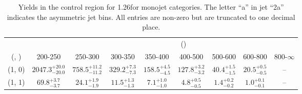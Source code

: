\begin{table}[h!]
\tiny
\centering
\caption{Yields in the \mj control region for 1.26\ifb for monojet categories. The letter ``a'' in jet \eg ``2a''  indicates the asymmetric jet bins. All entries are non-zero but are truncated to one decimal place.\label{tab:yieldssep_mu_wjetstolnuht_mono}}
\begin{tabular}
{ccccccccc}
	\hline\hline
&	& \multicolumn{8}{c}{\scalht (\gev)} \\ 
	 (\njet,  \nb) & 200-250 & 250-300 & 300-350 & 350-400 & 400-500 & 500-600 & 600-800 & 800-$\infty$ \\ [0.8ex] 
\hline
	(1, 0) & $2047.3^{+ 20.0 }_{- 20.0 }$ & $758.5^{+ 11.2 }_{- 11.2 }$ & $329.2^{+ 7.3 }_{- 7.3 }$ & $158.5^{+ 4.5 }_{- 4.5 }$ & $127.8^{+ 3.2 }_{- 3.2 }$ & $40.4^{+ 1.5 }_{- 1.5 }$ & $20.5^{+ 0.5 }_{- 0.5 }$ & -- \\[0.5ex] 
	(1, 1) & $69.8^{+ 3.7 }_{- 3.7 }$ & $24.1^{+ 1.9 }_{- 1.9 }$ & $11.5^{+ 1.3 }_{- 1.3 }$ & $7.1^{+ 1.0 }_{- 1.0 }$ & $4.8^{+ 0.5 }_{- 0.5 }$ & $1.4^{+ 0.2 }_{- 0.2 }$ & $1.0^{+ 0.1 }_{- 0.1 }$ & -- \\[0.5ex] 
	\hline
	\hline
\end{tabular}
\end{table}

